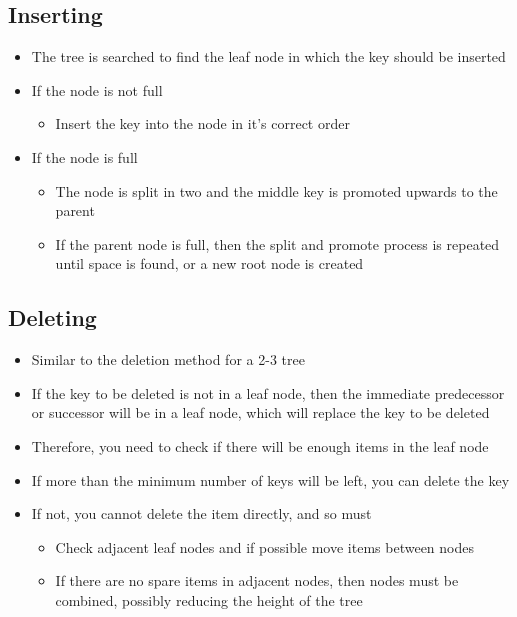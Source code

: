\subsection*{Inserting}

\begin{itemize}
  \item The tree is searched to find the leaf node in which the key should be inserted
  \item If the node is not full
  \begin{itemize}
    \item Insert the key into the node in it's correct order
  \end{itemize}
  \item If the node is full
  \begin{itemize}
    \item The node is split in two and the middle key is promoted upwards to the parent
    \item If the parent node is full, then the split and promote process is repeated until space is found, or a new root node is created
  \end{itemize}
\end{itemize}

\subsection*{Deleting}

\begin{itemize}
  \item Similar to the deletion method for a 2-3 tree
  \item If the key to be deleted is not in a leaf node, then the immediate predecessor or successor will be in a leaf node, which will replace the key to be deleted
  \item Therefore, you need to check if there will be enough items in the leaf node
  \item If more than the minimum number of keys will be left, you can delete the key
  \item If not, you cannot delete the item directly, and so must
  \begin{itemize}
    \item Check adjacent leaf nodes and if possible move items between nodes
    \item If there are no spare items in adjacent nodes, then nodes must be combined, possibly reducing the height of the tree
  \end{itemize}
\end{itemize}

